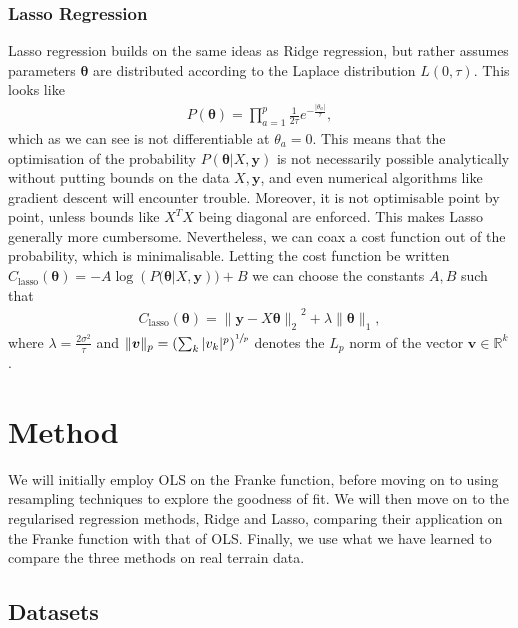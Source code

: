 \documentclass[twocolumn,english,notitlepage]{article}
\renewcommand{\vec}[1]{\boldsymbol{#1}}
\newcommand{\pclosed}[1]{\left(#1\right)}
\renewcommand{\norm}[2][]{\ensuremath{\|#2\|_{#1}}}
\renewcommand{\exp}[1]{e^{#1}}
\newcommand{\msub}[2]{\ensuremath{{#1}_\text{#2}}}
\begin{document}
        \subsubsection{Lasso Regression}
            Lasso regression builds on the same ideas as Ridge regression, but rather assumes parameters $\vec{\theta}$ are distributed according to the Laplace distribution $L(0, \tau)$. This looks like
            \begin{align}
                P(\vec{\theta}) = \prod_{a=1}^{p} \frac{1}{2\tau} \exp{-\frac{|\theta_a|}{\tau}},
            \end{align}
            which as we can see is not differentiable at $\theta_a = 0$. This means that the optimisation of the probability $P(\vec{\theta}|X, \vec{y})$ is not necessarily possible analytically without putting bounds on the data $X, \vec{y}$, and even numerical algorithms like gradient descent will encounter trouble. Moreover, it is not optimisable point by point, unless bounds like $X^TX$ being diagonal are enforced. This makes Lasso generally more cumbersome. Nevertheless, we can coax a cost function out of the probability, which is minimalisable. Letting the cost function be written $\msub{C}{lasso}(\vec{\theta}) = -A\log\pclosed{P(\vec{\theta}|X,\vec{y}}) + B$  we can choose the constants $A, B$ such that
            \begin{align}
                \boxed{
                    \msub{C}{lasso}(\vec{\vec{\theta}}) = \norm[2]{ \vec{y} - X\vec{\theta} }^2 + \lambda \norm[1]{\vec{\theta}},
                }
                \label{theo:eq:Lasso_costfunction}
            \end{align}
            where $\lambda = \frac{2\sigma^2}{\tau}$ and $\norm[p]{\vec{v}} = \pclosed{\sum_k |v_k|^p}^{\sfrac{1}{p}}$ denotes the $L_p$ norm of the vector $\vec{v} \in \mathbb{R}^k$.


\section{Method}
    We will initially employ OLS on the Franke function, before moving on to using resampling techniques to explore the goodness of fit. We will then move on to the regularised regression methods, Ridge and Lasso, comparing their application on the Franke function with that of OLS. Finally, we use what we have learned to compare the three methods on real terrain data.
    
    \subsection{Datasets}
\end{document}
